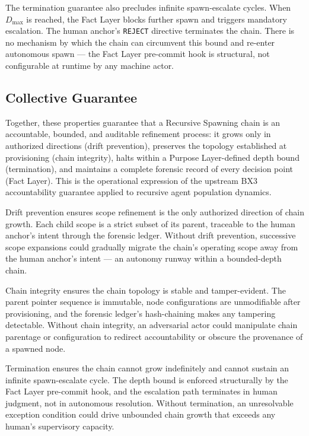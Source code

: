 The termination guarantee also precludes infinite spawn-escalate cycles. When $D_{\text{max}}$ is reached, the Fact Layer blocks further spawn and triggers mandatory escalation. The human anchor's \texttt{REJECT} directive terminates the chain. There is no mechanism by which the chain can circumvent this bound and re-enter autonomous spawn — the Fact Layer pre-commit hook is structural, not configurable at runtime by any machine actor.

\subsection{Collective Guarantee}
\label{sec:rs-collective-guarantee}

Together, these properties guarantee that a Recursive Spawning chain is an accountable, bounded, and auditable refinement process: it grows only in authorized directions (drift prevention), preserves the topology established at provisioning (chain integrity), halts within a Purpose Layer-defined depth bound (termination), and maintains a complete forensic record of every decision point (Fact Layer). This is the operational expression of the upstream BX3 accountability guarantee applied to recursive agent population dynamics.

Drift prevention ensures scope refinement is the only authorized direction of chain growth. Each child scope is a strict subset of its parent, traceable to the human anchor's intent through the forensic ledger. Without drift prevention, successive scope expansions could gradually migrate the chain's operating scope away from the human anchor's intent — an autonomy runway within a bounded-depth chain.

Chain integrity ensures the chain topology is stable and tamper-evident. The parent pointer sequence is immutable, node configurations are unmodifiable after provisioning, and the forensic ledger's hash-chaining makes any tampering detectable. Without chain integrity, an adversarial actor could manipulate chain parentage or configuration to redirect accountability or obscure the provenance of a spawned node.

Termination ensures the chain cannot grow indefinitely and cannot sustain an infinite spawn-escalate cycle. The depth bound is enforced structurally by the Fact Layer pre-commit hook, and the escalation path terminates in human judgment, not in autonomous resolution. Without termination, an unresolvable exception condition could drive unbounded chain growth that exceeds any human's supervisory capacity.
